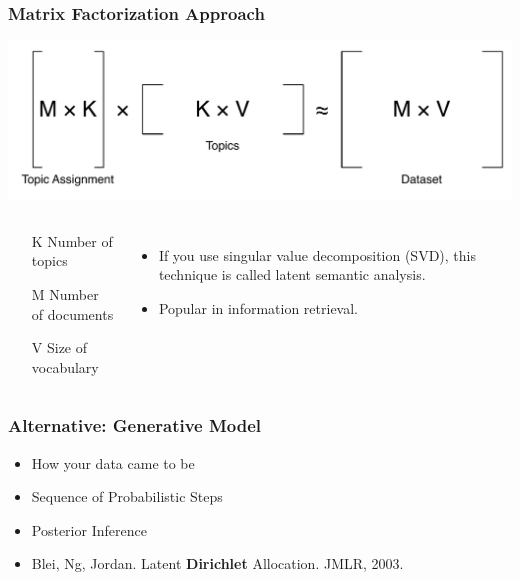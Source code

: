 \frame
{
  \frametitle{Matrix Factorization Approach}

\begin{center}
\includegraphics[width=0.9\linewidth]{topic_models/factorization.pdf}
\end{center}

\begin{columns}
\begin{block}{}
	\begin{itemize}
		\item[K] Number of topics
		\item[M] Number of documents
		\item[V] Size of vocabulary
	\end{itemize}
\end{block}
\pause
\begin{itemize}
\item If you use singular value decomposition (SVD), this technique is called latent semantic analysis.
\item Popular in information retrieval.
\end{itemize}
\end{columns}

}

\begin{frame}

\frametitle{Alternative: Generative Model}

\begin{itemize}
  \item How your data came to be
  \item Sequence of Probabilistic Steps
  \item Posterior Inference
    \pause
  \item Blei, Ng, Jordan.  Latent {\bf Dirichlet} Allocation.  JMLR, 2003.
\end{itemize}

\end{frame}

